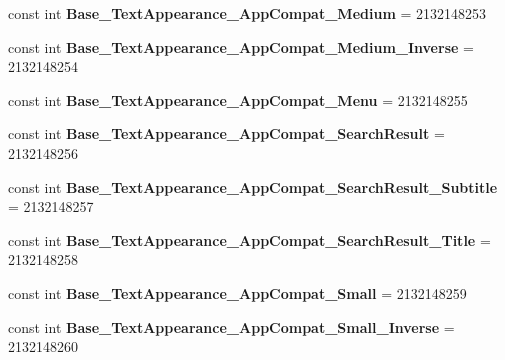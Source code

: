 \begin{DoxyCompactItemize}
\item 
\mbox{\label{classst_delivery_1_1_resource_1_1_style_a3f684d65c271d842de563f73778d695d}} 
const int {\bfseries Base\+\_\+\+Text\+Appearance\+\_\+\+App\+Compat\+\_\+\+Medium} = 2132148253
\item 
\mbox{\label{classst_delivery_1_1_resource_1_1_style_aa69e5949e42a0e9a6ecc7da61e4d0605}} 
const int {\bfseries Base\+\_\+\+Text\+Appearance\+\_\+\+App\+Compat\+\_\+\+Medium\+\_\+\+Inverse} = 2132148254
\item 
\mbox{\label{classst_delivery_1_1_resource_1_1_style_a70ab91672b6ccde101f5494ecffe9500}} 
const int {\bfseries Base\+\_\+\+Text\+Appearance\+\_\+\+App\+Compat\+\_\+\+Menu} = 2132148255
\item 
\mbox{\label{classst_delivery_1_1_resource_1_1_style_ac2e4719cfcab991f8309ef56ca748947}} 
const int {\bfseries Base\+\_\+\+Text\+Appearance\+\_\+\+App\+Compat\+\_\+\+Search\+Result} = 2132148256
\item 
\mbox{\label{classst_delivery_1_1_resource_1_1_style_adeb853d318458efcd30727ab1f0e1998}} 
const int {\bfseries Base\+\_\+\+Text\+Appearance\+\_\+\+App\+Compat\+\_\+\+Search\+Result\+\_\+\+Subtitle} = 2132148257
\item 
\mbox{\label{classst_delivery_1_1_resource_1_1_style_adf82478d543781d6f9b961254fb98a74}} 
const int {\bfseries Base\+\_\+\+Text\+Appearance\+\_\+\+App\+Compat\+\_\+\+Search\+Result\+\_\+\+Title} = 2132148258
\item 
\mbox{\label{classst_delivery_1_1_resource_1_1_style_a6a9b624ceea351f55cf269f569d239e0}} 
const int {\bfseries Base\+\_\+\+Text\+Appearance\+\_\+\+App\+Compat\+\_\+\+Small} = 2132148259
\item 
\mbox{\label{classst_delivery_1_1_resource_1_1_style_aa335d7ba450f4064fa61a1dca8c28912}} 
const int {\bfseries Base\+\_\+\+Text\+Appearance\+\_\+\+App\+Compat\+\_\+\+Small\+\_\+\+Inverse} = 2132148260

\end{DoxyCompactItemize}
